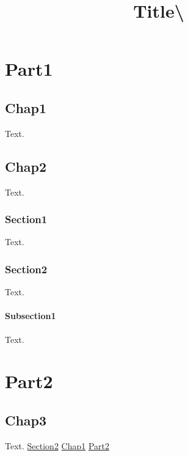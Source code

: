 \documentclass[a4paper,11pt]{book}
\title{Title\textbackslash{}}
\author{}
\date{}
\begin{document}
\part{Part1}
\label{s:1}
\chapter{Chap1}
\label{s:2}
Text.

\chapter{Chap2}
\label{s:3}
Text.

\section{Section1}
\label{s:4}
Text.

\section{Section2}
\label{s:5}
Text.

\subsection{Subsection1}
\label{s:6}
Text.

\part{Part2}
\label{s:7}
\chapter{Chap3}
\label{s:8}
Text.
\hyperref[s:5]{Section2}
\hyperref[s:2]{Chap1}
\hyperref[s:7]{Part2}
\end{document}
